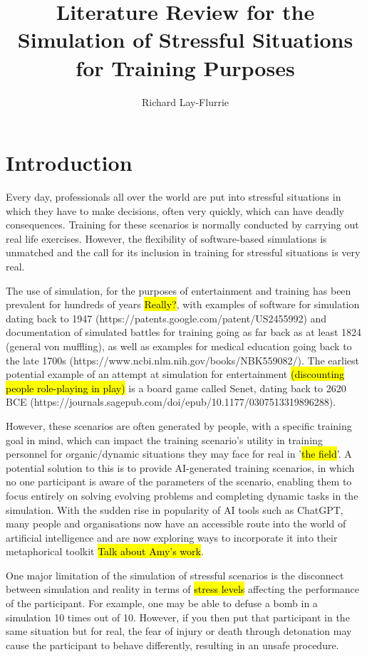 \documentclass{article}
\title{Literature Review for the Simulation of Stressful Situations for Training Purposes}
\author{Richard Lay-Flurrie}
\begin{document}
\maketitle

\tableofcontents



\section{Introduction}

Every day, professionals all over the world are put into stressful situations in which they have to make decisions, often very quickly, which can have deadly consequences. Training for these scenarios is normally conducted by carrying out real life exercises. However, the flexibility of software-based simulations is unmatched and the call for its inclusion in training for stressful situations is very real.



The use of simulation, for the purposes of entertainment and training has been prevalent for hundreds of years \hl{Really?}, with examples of software for simulation dating back to 1947 (https://patents.google.com/patent/US2455992) and documentation of simulated battles for training going as far back as at least 1824 (general von muffling), as well as examples for medical education going back to the late 1700s (https://www.ncbi.nlm.nih.gov/books/NBK559082/). The earliest potential example of an attempt at simulation for entertainment \hl{(discounting people role-playing in play)} is a board game called Senet, dating back to 2620 BCE (https://journals.sagepub.com/doi/epub/10.1177/0307513319896288).


However, these scenarios are often generated by people, with a specific training goal in mind, which can impact the training scenario's utility in training personnel for organic/dynamic situations they may face for real in '\hl{the field}'. A potential solution to this is to provide AI-generated training scenarios, in which no one participant is aware of the parameters of the scenario, enabling them to focus entirely on solving evolving problems and completing dynamic tasks in the simulation. With the sudden rise in popularity of AI tools such as ChatGPT, many people and organisations now have an accessible route into the world of artificial intelligence and are now exploring ways to incorporate it into their metaphorical toolkit \hl{Talk about Amy's work}. 

One major limitation of the simulation of stressful scenarios is the disconnect between simulation and reality in terms of \hl{stress levels} affecting the performance of the participant. For example, one may be able to defuse a bomb in a simulation 10 times out of 10. However, if you then put that participant in the same situation but for real, the fear of injury or death through detonation may cause the participant to behave differently, resulting in an unsafe procedure.
\end{document}
